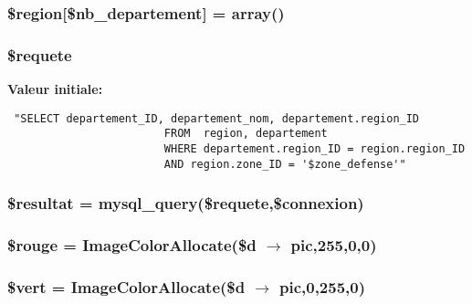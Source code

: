 \hypertarget{biotox__carto_8php_a8}{
\subsubsection[\$region]{\setlength{\rightskip}{0pt plus 5cm}\$region\mbox{[}\$nb\_\-departement\mbox{]} = array()}}
\label{biotox__carto_8php_a8}


\hypertarget{biotox__carto_8php_a4}{
\subsubsection[\$requete]{\setlength{\rightskip}{0pt plus 5cm}\$requete}}
\label{biotox__carto_8php_a4}


{\bf Valeur initiale:}

\footnotesize\begin{verbatim} "SELECT departement_ID, departement_nom, departement.region_ID
                        FROM  region, departement
                        WHERE departement.region_ID = region.region_ID
                        AND region.zone_ID = '$zone_defense'"
\end{verbatim}\normalsize 
\hypertarget{biotox__carto_8php_a5}{
\subsubsection[\$resultat]{\setlength{\rightskip}{0pt plus 5cm}\$resultat = mysql\_\-query(\$requete,\$connexion)}}
\label{biotox__carto_8php_a5}


\hypertarget{biotox__carto_8php_a12}{
\subsubsection[\$rouge]{\setlength{\rightskip}{0pt plus 5cm}\$rouge = Image\-Color\-Allocate(\$d $\rightarrow$ pic,255,0,0)}}
\label{biotox__carto_8php_a12}


\hypertarget{biotox__carto_8php_a11}{
\subsubsection[\$vert]{\setlength{\rightskip}{0pt plus 5cm}\$vert = Image\-Color\-Allocate(\$d $\rightarrow$ pic,0,255,0)}}
\label{biotox__carto_8php_a11}


